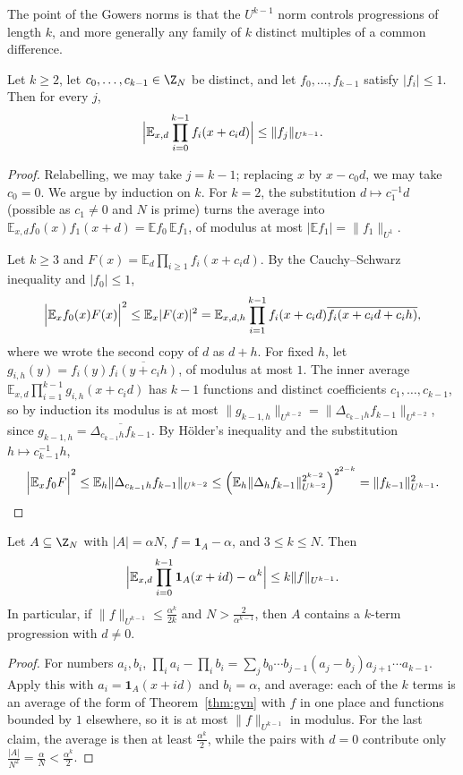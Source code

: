 The point of the Gowers norms is that the $U^{k-1}$ norm controls progressions of length $k$, and more generally any family of $k$ distinct multiples of a common difference.

\begin{theorem}\label{thm:gvn}
Let $k\ge2$, let $c_0,\dots,c_{k-1}\in\Z_N$ be distinct, and let $f_0,\dots,f_{k-1}$ satisfy $|f_i|\le1$. Then for every $j$,
\[
\Bigl|\mathbb E_{x,d}\prod_{i=0}^{k-1}f_i(x+c_id)\Bigr|\le\|f_j\|_{U^{k-1}}.
\]
\end{theorem}
\begin{proof}
Relabelling, we may take $j=k-1$; replacing $x$ by $x-c_0d$, we may take $c_0=0$. We argue by induction on $k$. For $k=2$, the substitution $d\mapsto c_1^{-1}d$ (possible as $c_1\ne0$ and $N$ is prime) turns the average into $\mathbb E_{x,d}f_0(x)f_1(x+d)=\mathbb E f_0\,\mathbb E f_1$, of modulus at most $|\mathbb E f_1|=\|f_1\|_{U^1}$.

Let $k\ge3$ and $F(x)=\mathbb E_d\prod_{i\ge1}f_i(x+c_id)$. By the Cauchy--Schwarz inequality and $|f_0|\le1$,
\[
\Bigl|\mathbb E_xf_0(x)F(x)\Bigr|^2\le\mathbb E_x|F(x)|^2=\mathbb E_{x,d,h}\prod_{i=1}^{k-1}f_i(x+c_id)\overline{f_i(x+c_id+c_ih)},
\]
where we wrote the second copy of $d$ as $d+h$. For fixed $h$, let $g_{i,h}(y)=f_i(y)\overline{f_i(y+c_ih)}$, of modulus at most $1$. The inner average $\mathbb E_{x,d}\prod_{i=1}^{k-1}g_{i,h}(x+c_id)$ has $k-1$ functions and distinct coefficients $c_1,\dots,c_{k-1}$, so by induction its modulus is at most $\|g_{k-1,h}\|_{U^{k-2}}=\|\Delta_{c_{k-1}h}f_{k-1}\|_{U^{k-2}}$, since $g_{k-1,h}=\overline{\Delta_{c_{k-1}h}f_{k-1}}$. By Hölder's inequality and the substitution $h\mapsto c_{k-1}^{-1}h$,
\[
\Bigl|\mathbb E_xf_0F\Bigr|^2\le\mathbb E_h\|\Delta_{c_{k-1}h}f_{k-1}\|_{U^{k-2}}\le\Bigl(\mathbb E_h\|\Delta_hf_{k-1}\|_{U^{k-2}}^{2^{k-2}}\Bigr)^{2^{2-k}}=\|f_{k-1}\|_{U^{k-1}}^2.
\]
\end{proof}

\begin{corollary}\label{cor:countk}
Let $A\subseteq\Z_N$ with $|A|=\alpha N$, $f=\mathbf1_A-\alpha$, and $3\le k\le N$. Then
\[
\Bigl|\mathbb E_{x,d}\prod_{i=0}^{k-1}\mathbf1_A(x+id)-\alpha^k\Bigr|\le k\|f\|_{U^{k-1}}.
\]
In particular, if $\|f\|_{U^{k-1}}\le\frac{\alpha^k}{2k}$ and $N>\frac2{\alpha^{k-1}}$, then $A$ contains a $k$-term progression with $d\neq0$.
\end{corollary}
\begin{proof}
For numbers $a_i,b_i$, $\prod_ia_i-\prod_ib_i=\sum_jb_0\cdots b_{j-1}(a_j-b_j)a_{j+1}\cdots a_{k-1}$. Apply this with $a_i=\mathbf1_A(x+id)$ and $b_i=\alpha$, and average: each of the $k$ terms is an average of the form of Theorem~\ref{thm:gvn} with $f$ in one place and functions bounded by $1$ elsewhere, so it is at most $\|f\|_{U^{k-1}}$ in modulus. For the last claim, the average is then at least $\frac{\alpha^k}2$, while the pairs with $d=0$ contribute only $\frac{|A|}{N^2}=\frac\alpha N<\frac{\alpha^k}2$.
\end{proof}

